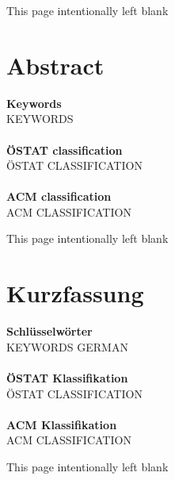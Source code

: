 {\clearpage
\begin{center}
This page intentionally left blank
\end{center}
\clearpage

\section*{Abstract}




\vfill
\noindent
\textbf{Keywords}\\
KEYWORDS\\
\\
\textbf{ÖSTAT classification}\\
ÖSTAT CLASSIFICATION\\
\\
\textbf{ACM classification}\\
ACM CLASSIFICATION

\clearpage
\begin{center}
This page intentionally left blank
\end{center}
\clearpage



\section*{Kurzfassung}



\vfill
\noindent
\textbf{Schlüsselwörter}\\
KEYWORDS GERMAN\\
\\
\textbf{ÖSTAT Klassifikation}\\
ÖSTAT CLASSIFICATION\\
\\
\textbf{ACM Klassifikation}\\
ACM CLASSIFICATION

\clearpage
\begin{center}
This page intentionally left blank
\end{center}
\clearpage

}
